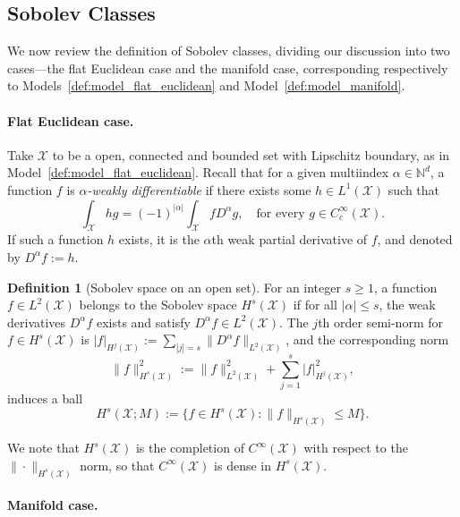 \documentclass{article}
\newcommand{\1}{\mathbf{1}}
\newcommand{\Leb}{L}
\newcommand{\mc}[1]{\mathcal{#1}}
\theoremstyle{alden}
\theoremstyle{aldenthm}
\theoremstyle{definition}
\newtheorem{definition}{Definition}[section]
\theoremstyle{remark}
\begin{document}
\subsection{Sobolev Classes}
\label{sec:sobolev}
We now review the definition of Sobolev classes, dividing our discussion into two cases---the flat Euclidean case and the manifold case, corresponding respectively to Models~\ref{def:model_flat_euclidean} and Model~\ref{def:model_manifold}.

\paragraph{Flat Euclidean case.}
Take $\mc{X}$ to be a open, connected and bounded set with Lipschitz boundary, as in Model~\ref{def:model_flat_euclidean}. Recall that for a given multiindex $\alpha \in \mathbb{N}^d$, a function $f$ is \emph{$\alpha$-weakly differentiable} if there exists some $h \in L^1(\mc{X})$ such that
\begin{equation*}
\int_{\mc{X}} h g = (-1)^{|\alpha|} \int_{\mc{X}} f D^{\alpha}g, \quad \textrm{for every $g \in C_c^{\infty}(\mc{X})$.}
\end{equation*}
If such a function $h$ exists, it is the $\alpha$th weak partial derivative of $f$, and denoted by $D^{\alpha}f := h$. 

\begin{definition}[Sobolev space on an open set]
	\label{def:sobolev_space}
	For an integer $s \geq 1$, a function $f \in L^2(\mc{X})$ belongs to the Sobolev space $H^s(\mc{X})$ if for all $|\alpha| \leq s$, the weak derivatives $D^{\alpha}f$ exists and satisfy $D^{\alpha}f \in L^2(\mc{X})$. The $j$th order semi-norm for $f \in H^s(\mc{X})$ is $|f|_{H^j(\mc{X})} := \sum_{|j| = s}\|D^{\alpha}f\|_{\Leb^2(\mc{X})}$, and the corresponding norm
	\begin{equation*}
	\|f\|_{H^s(\mc{X})}^2 := \|f\|_{\Leb^2(\mc{X})}^2 + \sum_{j = 1}^{s} |f|_{H^j(\mc{X})}^2,
	\end{equation*}
	induces a ball
	\begin{equation*}
	H^s(\mc{X};M) := \bigl\{f \in H^s(\mc{X}): \|f\|_{H^s(\mc{X})} \leq M\bigr\}.
	\end{equation*} 
\end{definition}
We note that $H^s(\mc{X})$ is the completion of $C^{\infty}(\mc{X})$ with respect to the $\|\cdot\|_{H^s(\mc{X})}$ norm, so that $C^{\infty}(\mc{X})$ is dense in $H^s(\mc{X})$. 

\paragraph{Manifold case.}
\end{document}
